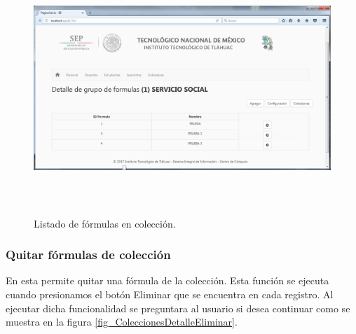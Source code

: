 			    \begin{figure}[]
			        \centering
			        \includegraphics[width=16cm, height=9.5cm]{figuras/ColeccionesDetalleTabla}
			        \caption{Listado de f\'ormulas en colecci\'on.}
			        \label{fig_ColeccionesDetalleTabla}
			    \end{figure}

			\subsubsection{Quitar f\'ormulas de colecci\'on}

				En esta permite quitar una f\'ormula de la colecci\'on. Esta funci\'on se ejecuta cuando presionamos el bot\'on Eliminar que se encuentra en cada registro. Al ejecutar dicha funcionalidad se preguntara al usuario si desea continuar como se muestra en la figura \ref{fig_ColeccionesDetalleEliminar}.


